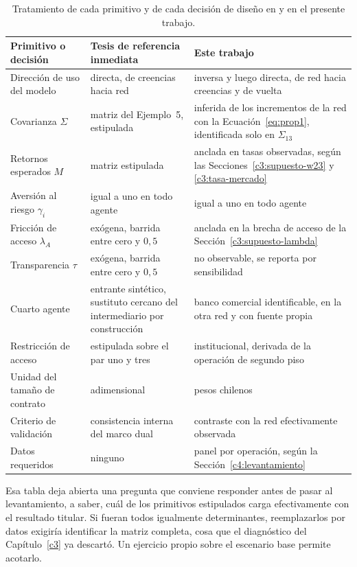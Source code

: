 \begin{table}[H]
    \centering
    \small
    \caption[Comparación entre la tesis de referencia inmediata y este
    trabajo]{Tratamiento de cada primitivo y de cada decisión de diseño en
     y en el presente trabajo.}
    \label{tab:comparacion-venegas}
    \begin{tabular}{p{3.2cm}p{4.4cm}p{5.6cm}}
        \toprule
        Primitivo o decisión & Tesis de referencia inmediata & Este trabajo \\
        \midrule
        Dirección de uso del modelo & directa, de creencias hacia red & inversa y luego directa, de red hacia creencias y de vuelta \\
        Covarianza $\Sigma$ & matriz del Ejemplo~5, estipulada & inferida de los incrementos de la red con la Ecuación~\eqref{eq:prop1}, identificada solo en $\Sigma_{13}$ \\
        Retornos esperados $M$ & matriz estipulada & anclada en tasas observadas, según las Secciones~\ref{c3:supuesto-w23} y \ref{c3:tasa-mercado} \\
        Aversión al riesgo $\gamma_i$ & igual a uno en todo agente & igual a uno en todo agente \\
        Fricción de acceso $\lambda_A$ & exógena, barrida entre cero y $0,5$ & anclada en la brecha de acceso de la Sección~\ref{c3:supuesto-lambda} \\
        Transparencia $\tau$ & exógena, barrida entre cero y $0,5$ & no observable, se reporta por sensibilidad \\
        Cuarto agente & entrante sintético, sustituto cercano del intermediario por construcción & banco comercial identificable, en la otra red y con fuente propia \\
        Restricción de acceso & estipulada sobre el par uno y tres & institucional, derivada de la operación de segundo piso \\
        Unidad del tamaño de contrato & adimensional & pesos chilenos \\
        Criterio de validación & consistencia interna del marco dual & contraste con la red efectivamente observada \\
        Datos requeridos & ninguno & panel por operación, según la Sección~\ref{c4:levantamiento} \\
        \bottomrule
    \end{tabular}
\end{table}

Esa tabla deja abierta una pregunta que conviene responder antes de pasar al levantamiento, a saber, cuál de los primitivos estipulados carga efectivamente con el resultado titular. Si fueran todos igualmente determinantes, reemplazarlos por datos exigiría identificar la matriz completa, cosa que el diagnóstico del Capítulo~\ref{c3} ya descartó. Un ejercicio propio sobre el escenario base permite acotarlo.

